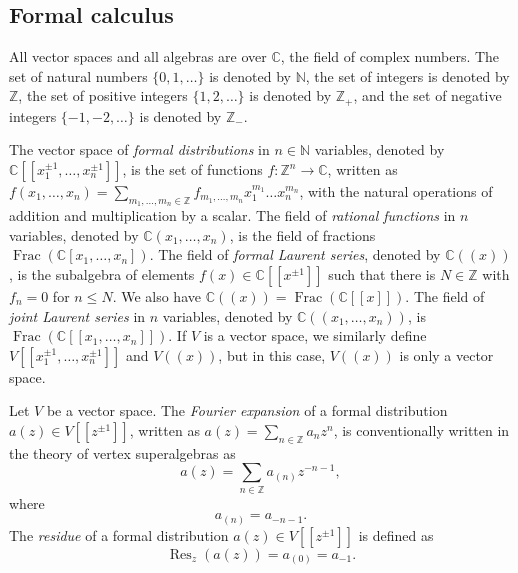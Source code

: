 \documentclass[a4paper, 12pt, reqno]{amsart}
\theoremstyle{remark}
\numberwithin{equation}{subsection}
\DeclareMathOperator{\Frac}{Frac}
\DeclareMathOperator{\Res}{Res}
\begin{document}
\subsection{Formal calculus}
\label{sec:formal-calculus}

All vector spaces and all algebras are over $\mathbb{C}$, the field of complex numbers.
The set of natural numbers $\{0, 1, \dots\}$ is denoted by $\mathbb{N}$, the set of integers is denoted by $\mathbb{Z}$, the set of positive integers $\{1, 2, \dots\}$ is denoted by $\mathbb{Z}_+$, and the set of negative integers $\{-1, -2, \dots\}$ is denoted by $\mathbb{Z}_-$.

The vector space of \emph{formal distributions} in $n \in \mathbb{N}$ variables, denoted by $\mathbb{C}[[x_1^{\pm 1}, \dots, x_n^{\pm 1}]]$, is the set of functions $f: \mathbb{Z}^n \to \mathbb{C}$, written as $f(x_1, \dots, x_n) = \sum_{m_1, \dots, m_n \in \mathbb{Z}}f_{m_1, \dots, m_n}x_1^{m_1}\dots x_n^{m_n}$, with the natural operations of addition and multiplication by a scalar.
The field of \emph{rational functions} in $n$ variables, denoted by $\mathbb{C}(x_1, \dots, x_n)$, is the field of fractions $\Frac(\mathbb{C}[x_1, \dots, x_n])$.
The field of \emph{formal Laurent series}, denoted by $\mathbb{C}((x))$, is the subalgebra of elements $f(x) \in \mathbb{C}[[x^{\pm 1}]]$ such that there is $N \in \mathbb{Z}$ with $f_n = 0$ for $n \le N$.
We also have $\mathbb{C}((x)) = \Frac(\mathbb{C}[[x]])$.
The field of \emph{joint Laurent series} in $n$ variables, denoted by $\mathbb{C}((x_1, \dots, x_n))$, is $\Frac(\mathbb{C}[[x_1, \dots, x_n]])$.
If $V$ is a vector space, we similarly define $V[[x_1^{\pm 1}, \dots, x_n^{\pm 1}]]$ and $V((x))$, but in this case, $V((x))$ is only a vector space.

Let $V$ be a vector space.
The \emph{Fourier expansion} of a formal distribution $a(z) \in V[[z^{\pm 1}]]$, written as $a(z) = \sum_{n \in \mathbb{Z}} a_nz^n$, is conventionally written in the theory of vertex superalgebras as
\begin{equation*}
  a(z) = \sum_{n \in \mathbb{Z}}a_{(n)}z^{-n - 1},
\end{equation*}
where
\begin{equation*}
  a_{(n)} = a_{-n - 1}.
\end{equation*}
The \emph{residue} of a formal distribution $a(z) \in V[[z^{\pm 1}]]$ is defined as
\begin{equation*}
  \Res_z(a(z)) = a_{(0)} = a_{-1}.
\end{equation*}
\end{document}
